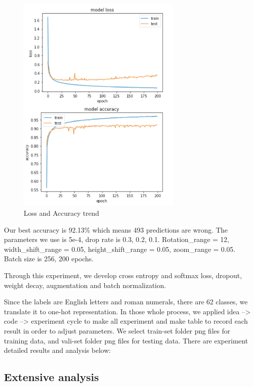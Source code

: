 \documentclass[twoside,twocolumn,10.8pt]{article}
\begin{document}
\begin{figure}[h]
\includegraphics[width=8cm]{acc_loss.png}
\caption{Loss and Accuracy trend}\label{fig2}
\centering
\end{figure}




\noindent Our best accuracy is 92.13\% which means 493 predictions are wrong. The parameters we use is 5e-4, drop rate is 0.3, 0.2, 0.1. Rotation\_range = 12, width\_shift\_range = 0.05, height\_shift\_range = 0.05, zoom\_range = 0.05. Batch size is 256, 200 epochs.


\noindent Through this experiment, we develop cross entropy and softmax loss, dropout, weight decay, augmentation and batch normalization.


\noindent Since the labels are English letters and roman numerals, there are 62 classes, we translate it to one-hot representation. In those whole process, we applied idea --> code --> experiment cycle to make all experiment and make table to record each result in order to adjust parameters. 
We select train-set folder png files for training data, and vali-set folder png files for testing data. There are experiment detailed results and analysis below:

\subsection{Extensive analysis}
\end{document}
